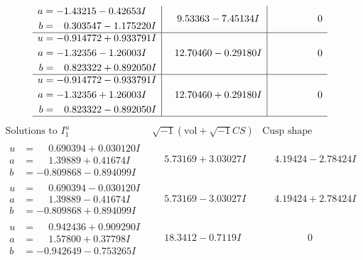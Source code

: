 \documentclass[1p]{elsarticle_modified}
\theoremstyle{definition}
\newcommand{\I}{\sqrt{-1}}
\begin{document}
$$\begin{array}{c|c|c}
\begin{aligned}
a &= -1.43215 - 0.42653 I \\
b &= \phantom{-}0.303547 - 1.175220 I\end{aligned}
 & \phantom{-}9.53363 - 7.45134 I & \phantom{-0.000000 } 0 \\ \hline\begin{aligned}
u &= -0.914772 + 0.933791 I \\
a &= -1.32356 - 1.26003 I \\
b &= \phantom{-}0.823322 + 0.892050 I\end{aligned}
 & \phantom{-}12.70460 - 0.29180 I & \phantom{-0.000000 } 0 \\ \hline\begin{aligned}
u &= -0.914772 - 0.933791 I \\
a &= -1.32356 + 1.26003 I \\
b &= \phantom{-}0.823322 - 0.892050 I\end{aligned}
 & \phantom{-}12.70460 + 0.29180 I & \phantom{-0.000000 } 0\\
 \hline 
 \end{array}$$\newpage$$\begin{array}{c|c|c}  
\text{Solutions to }I^u_{1}& \I (\text{vol} + \sqrt{-1}CS) & \text{Cusp shape}\\
 \hline 
\begin{aligned}
u &= \phantom{-}0.690394 + 0.030120 I \\
a &= \phantom{-}1.39889 + 0.41674 I \\
b &= -0.809868 - 0.894099 I\end{aligned}
 & \phantom{-}5.73169 + 3.03027 I & \phantom{-}4.19424 - 2.78424 I \\ \hline\begin{aligned}
u &= \phantom{-}0.690394 - 0.030120 I \\
a &= \phantom{-}1.39889 - 0.41674 I \\
b &= -0.809868 + 0.894099 I\end{aligned}
 & \phantom{-}5.73169 - 3.03027 I & \phantom{-}4.19424 + 2.78424 I \\ \hline\begin{aligned}
u &= \phantom{-}0.942436 + 0.909290 I \\
a &= \phantom{-}1.57800 + 0.37798 I \\
b &= -0.942649 - 0.753265 I\end{aligned}
 & \phantom{-}18.3412 - 0.7119 I & \phantom{-0.000000 } 0 \\ \hline\begin{aligned}

\end{aligned}
\end{array}$$
\end{document}

